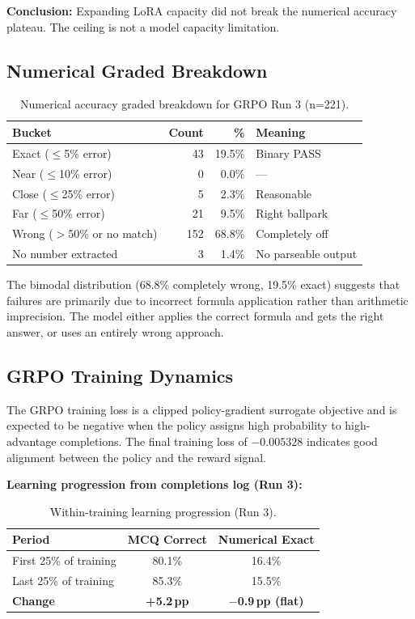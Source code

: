 \documentclass[12pt]{report}
\begin{document}
\textbf{Conclusion:} Expanding LoRA capacity did not break the numerical accuracy plateau. The ceiling is not a model capacity limitation.

\subsection{Numerical Graded Breakdown}

\begin{table}[H]
\centering
\caption{Numerical accuracy graded breakdown for GRPO Run 3 (n=221).}
\label{tab:graded}
\begin{tabular}{lrrl}
\toprule
\textbf{Bucket} & \textbf{Count} & \textbf{\%} & \textbf{Meaning} \\
\midrule
Exact ($\leq$5\% error) & 43 & 19.5\% & Binary PASS \\
Near ($\leq$10\% error) & 0 & 0.0\% & --- \\
Close ($\leq$25\% error) & 5 & 2.3\% & Reasonable \\
Far ($\leq$50\% error) & 21 & 9.5\% & Right ballpark \\
Wrong ($>$50\% or no match) & 152 & 68.8\% & Completely off \\
No number extracted & 3 & 1.4\% & No parseable output \\
\bottomrule
\end{tabular}
\end{table}

The bimodal distribution (68.8\% completely wrong, 19.5\% exact) suggests that failures are primarily due to incorrect formula application rather than arithmetic imprecision. The model either applies the correct formula and gets the right answer, or uses an entirely wrong approach.

\subsection{GRPO Training Dynamics}

The GRPO training loss is a clipped policy-gradient surrogate objective and is expected to be negative when the policy assigns high probability to high-advantage completions. The final training loss of $-0.005328$ indicates good alignment between the policy and the reward signal.

\textbf{Learning progression from completions log (Run 3):}

\begin{table}[H]
\centering
\caption{Within-training learning progression (Run 3).}
\label{tab:progression}
\begin{tabular}{lcc}
\toprule
\textbf{Period} & \textbf{MCQ Correct} & \textbf{Numerical Exact} \\
\midrule
First 25\% of training & 80.1\% & 16.4\% \\
Last 25\% of training & 85.3\% & 15.5\% \\
\midrule
\textbf{Change} & \textbf{+5.2\,pp} & \textbf{$-$0.9\,pp (flat)} \\
\bottomrule
\end{tabular}
\end{table}
\end{document}
